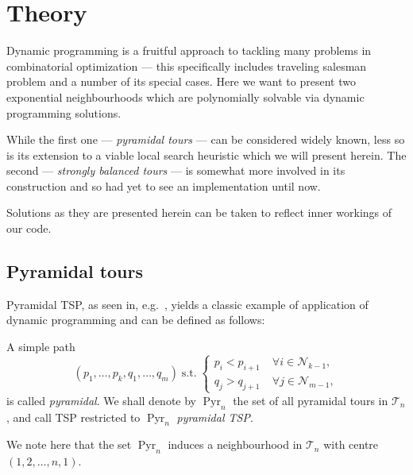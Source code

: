 \documentclass[index=totoc,bibliography=totoc]{scrartcl}
\numberwithin{equation}{section}
\numberwithin{figure}{section}
\numberwithin{table}{section}
\let\defstyle\itshape
\begin{document}

\section{Theory}
\vspace{0.87em}

Dynamic programming is a fruitful approach to tackling many problems in
combinatorial optimization --- this specifically includes traveling
salesman problem and a number of its special cases.  Here we want to
present two exponential neighbourhoods which are polynomially solvable via
dynamic programming solutions.

While the first one --- {\defstyle pyramidal tours} --- can be considered
widely known, less so is its extension to a viable local search heuristic
which we will present herein.  The second --- {\defstyle strongly balanced
  tours} --- is somewhat more involved in its construction and so had yet
to see an implementation until now.

Solutions as they are presented herein can be taken to reflect inner
workings of our code.

\subsection{Pyramidal tours}

Pyramidal TSP, as seen in, e.g.\ \cite{burkard,gilmore}, yields a
classic example of application of dynamic programming and can be defined as
follows:

\begin{define}
  A simple path
  \[
  \left( p_1, \ldots, p_k, q_1, \ldots, q_m \right)
  \; \text{s.t.} \;
  \begin{cases}
    p_i < p_{i+1} \; & \forall i \in \mathcal{N}_{k-1},\\
    q_j > q_{j+1} \; & \forall j \in \mathcal{N}_{m-1},
  \end{cases}
  \]
  is called {\defstyle pyramidal}.  We shall denote by
  $\operatorname{Pyr}_n$ the set of all pyramidal tours in $\mathcal{T}_n$,
  and call TSP restricted to $\operatorname{Pyr}_n$ {\defstyle pyramidal TSP}.
\end{define}
We note here that the set $\operatorname{Pyr}_n$
induces a neighbourhood in $\mathcal{T}_n$ with centre
$\left(1, 2, \ldots, n, 1\right)$.
\end{document}
